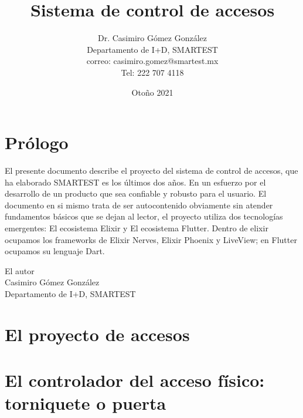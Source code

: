 \documentclass[12pt]{book}
\title{Sistema de control de accesos}
\author{Dr. Casimiro Gómez González\\
	Departamento de I+D, SMARTEST\\
               correo: casimiro.gomez@smartest.mx\\
               Tel: 222 707 4118}
\date{Otoño 2021}
\theoremstyle{definition}
\theoremstyle{remark}
\theoremstyle{plain}
\begin{document}
\frontmatter
\maketitle


\chapter{Prólogo}

El presente documento describe el proyecto del sistema de control de accesos, que ha elaborado SMARTEST es los últimos dos años. En un esfuerzo por el desarrollo de un producto que sea confiable y robusto para el usuario. El documento en si mismo trata de ser autocontenido obviamente sin atender fundamentos básicos que se dejan al lector, el proyecto utiliza dos tecnologías emergentes: El ecosistema Elixir y El ecosistema Flutter. Dentro de elixir ocupamos los frameworks de Elixir Nerves, Elixir Phoenix y LiveView; en Flutter ocupamos su lenguaje Dart.



\begin{flushright}

El autor\\
Casimiro Gómez González\\
Departamento de I+D, SMARTEST
\end{flushright}

\tableofcontents

\mainmatter


\chapter{El proyecto de accesos}


\chapter{El controlador del acceso físico: torniquete o puerta}


\backmatter
\end{document}
